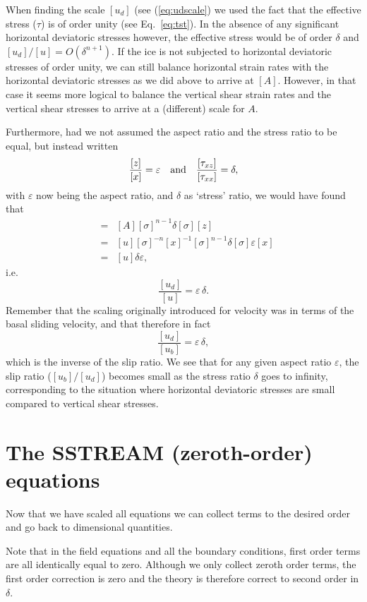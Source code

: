 \documentclass[10pt,a4paper]{book}
\newcommand{\epsi}{\varepsilon}
\newcommand{\de}{\delta}
\begin{document}
When finding the scale $[u_d]$ (see (\ref{eq:udscale}) we used the
fact that the effective stress ($\tau$) is of order unity (see
Eq.~\ref{eq:tst}).  In the absence of any significant horizontal
deviatoric stresses however, the effective stress would be of order
$\de$ and $[u_d]/[u]=O(\de^{n+1})$. If the ice is not subjected to horizontal
deviatoric stresses of order unity, we can still balance horizontal
strain rates with the horizontal deviatoric stresses as we did above
to arrive at $[A]$. However, in that case it seems more logical to
balance the vertical shear strain rates and the vertical shear
stresses to arrive at a (different) scale for $A$.


Furthermore, had we not assumed the aspect ratio and the stress ratio to be equal, but instead
written
\[
\frac{[z]}{[x]}=\epsi \quad \hbox{and} \quad \frac{[\tau_{xz}]}{[\tau_{xx}]}=\de ,
\]
with $\epsi$ now being the aspect ratio, and $\de$ as `stress' ratio,
we would have found that
\begin{eqnarray*}
[u_d]&=& [A] [\sigma]^{n-1} \de [\sigma] [z]  \\
     &=& [u] [\sigma]^{-n} [x]^{-1} [\sigma]^{n-1} \de [\sigma] \epsi [x]  \\
     &=& [u]  \de \epsi  ,
\end{eqnarray*}
i.e.\
\[ 
\frac{[u_d]}{[u]}= \epsi \, \de . 
\]
Remember that the scaling originally introduced for velocity was in terms of  
the basal sliding velocity, and that therefore in fact
\[ 
\frac{[u_d]}{[u_b]}= \epsi \, \de ,
\]
which is the inverse of the slip ratio.  We see that for any given
aspect ratio $\epsi$, the slip ratio ($[u_b]/[u_d]$) becomes small as
the stress ratio $\de$ goes to infinity, corresponding to the
situation where horizontal deviatoric stresses are small compared to
vertical shear stresses.


\section{The SSTREAM (zeroth-order) equations}
Now that we have scaled all equations we can collect terms to the
desired order and go back to dimensional quantities. 


Note that in the field equations and all the boundary conditions,
first order terms are all identically equal to zero. Although we only
collect zeroth order terms, the first order correction is zero and the
theory is therefore correct to second order in $\de$.

\setlength{\arraycolsep}{2pt}
\end{document}
